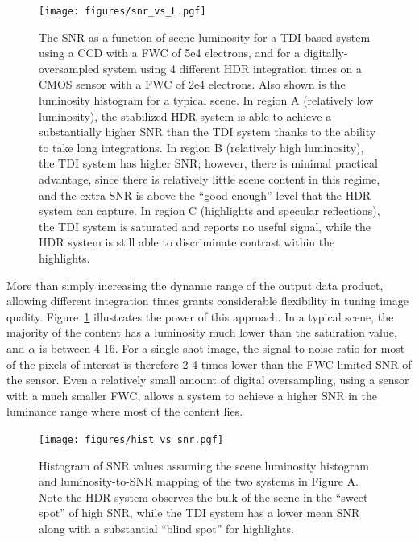 \documentclass[10pt,journal]{IEEEtran}  %
\begin{document}
\begin{figure}
  \texttt{[image: figures/snr\_vs\_L.pgf]}
  \caption{The SNR as a function of scene luminosity for a TDI-based system using a CCD with a FWC of 5e4 electrons, and for a digitally-oversampled system using 4 different HDR integration times on a CMOS sensor with a FWC of 2e4 electrons. Also shown is the luminosity histogram for a typical scene. In region A (relatively low luminosity), the stabilized HDR system is able to achieve a substantially higher SNR than the TDI system thanks to the ability to take long integrations. In region B (relatively high luminosity), the TDI system has higher SNR; however, there is minimal practical advantage, since there is relatively little scene content in this regime, and the extra SNR is above the “good enough” level that the HDR system can capture. In region C (highlights and specular reflections), the TDI system is saturated and reports no useful signal, while the HDR system is still able to discriminate contrast within the highlights. \label{fig:snr_vs_L}}
\end{figure}

More than simply increasing the dynamic range of the output data product, allowing different integration times grants considerable flexibility in tuning image quality. Figure~\ref{fig:snr_vs_L} illustrates the power of this approach. In a typical scene, the majority of the content has a luminosity much lower than the saturation value, and $\alpha$ is between 4-16. For a single-shot image, the signal-to-noise ratio for most of the pixels of interest is therefore 2-4 times lower than the FWC-limited SNR of the sensor. Even a relatively small amount of digital oversampling, using a sensor with a much smaller FWC, allows a system to achieve a higher SNR in the luminance range where most of the content lies. 

\begin{figure}
  \texttt{[image: figures/hist\_vs\_snr.pgf]}
  \caption{Histogram of SNR values assuming the scene luminosity histogram and luminosity-to-SNR mapping of the two systems in Figure A. Note the HDR system observes the bulk of the scene in the “sweet spot” of high SNR, while the TDI system has a lower mean SNR along with a substantial “blind spot” for highlights.  \label{fig:hist_vs_snr}}
\end{figure}
\end{document}
